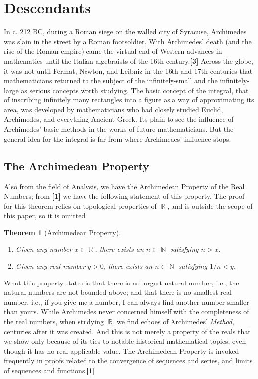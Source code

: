 \documentclass[letterpaper, 12pt]{amsart}
\DeclareMathOperator{\N}{\mathbb{N}}
\DeclareMathOperator{\R}{\mathbb{R}}
\newtheorem{thm}{Theorem}[section]
\theoremstyle{definition}  %
\begin{document}
	\section{Descendants}
	\label{sec:descendants}
	In c. 212 BC, during a Roman siege on the walled city of Syracuse, Archimedes was slain in the street by a Roman footsoldier.
	With Archimedes' death (and the rise of the Roman empire) came the virtual end of Western advances in mathematics until the Italian algebraists of the 16th century.\textbf{[3]}
	Across the globe, it was not until Fermat, Newton, and Leibniz in the 16th and 17th centuries that mathematicians returned to the subject of the infinitely-small and the infinitely-large as serious concepts worth studying.
	The basic concept of the integral, that of inscribing infinitely many rectangles into a figure as a way of approximating its area, was developed by mathematicians who had closely studied Euclid, Archimedes, and everything Ancient Greek.
	Its plain to see the influence of Archimedes' basic methods in the works of future mathematicians.
	But the general idea for the integral is far from where Archimedes' influence stops.

		\subsection{The Archimedean Property}
		\label{sub:the_archimedean_property}
		Also from the field of Analysis, we have the Archimedean Property of the Real Numbers; from \textbf{[1]} we have the following statement of this property.
		The proof for this theorem relies on topological properties of $\R$, and is outside the scope of this paper, so it is omitted.
		\begin{thm}[Archimedean Property]
		\
			\begin{enumerate}
				\item Given any number $x \in \R$, there exists an $n \in \N$ satisfying $n > x$.
				\item Given any real number $y > 0$, there exists an $n \in \N$ satisfying $1/n < y$.
			\end{enumerate}
		\end{thm}
		
		What this property states is that there is no largest natural number, i.e., the natural numbers are not bounded above; and that there is no smallest real number, i.e., if you give me a number, I can always find another number smaller than yours.
		While Archimedes never concerned himself with the completeness of the real numbers, when studying $\R$ we find echoes of Archimedes' \textit{Method}, centuries after it was created.
		And this is not merely a property of the reals that we show only because of its ties to notable historical mathematical topics, even though it has no real applicable value.
		The Archimedean Property is invoked frequently in proofs related to the convergence of sequences and series, and limits of sequences and functions.\textbf{[1]}
\end{document}
